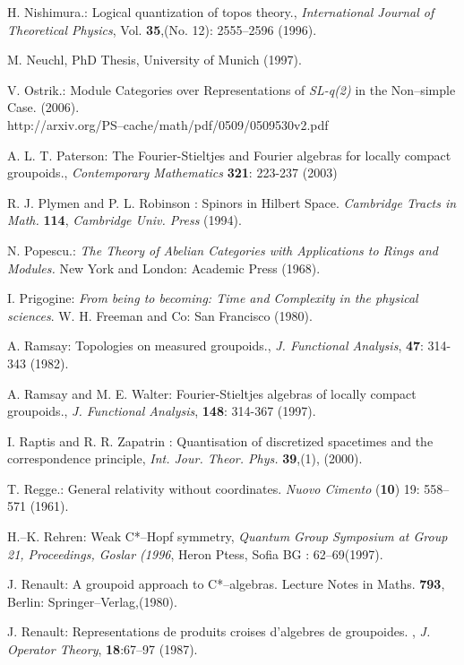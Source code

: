 \documentclass[12pt]{article}
\theoremstyle{plain}
\theoremstyle{definition}
\numberwithin{equation}{section}
\newcommand{\<}{{\langle}}
\begin{document}
\begin{thebibliography}{99}
H. Nishimura.: Logical quantization of topos theory., \textit{International Journal of Theoretical Physics}, Vol. \textbf{35},(No. 12): 2555--2596 (1996).

M. Neuchl, PhD Thesis, University of Munich (1997).

V. Ostrik.: Module Categories over Representations of \emph{SL-q(2)}
in the Non--simple Case. (2006). \\ http://arxiv.org/PS--cache/math/pdf/0509/0509530v2.pdf

A. L. T. Paterson: The Fourier-Stieltjes and Fourier algebras for locally
compact groupoids., \textit{Contemporary Mathematics} \textbf{321}: 223-237 (2003)

R. J. Plymen and P. L. Robinson :  Spinors in Hilbert Space.
\emph{Cambridge Tracts in Math.} \textbf{114}, \emph{Cambridge Univ. Press} (1994).

N. Popescu.: \emph{The Theory of Abelian Categories with Applications to Rings and
Modules.} New York and London: Academic Press (1968).

I. Prigogine:  \textit{From being to becoming: Time and Complexity in the physical sciences}. W. H. Freeman and Co: San Francisco (1980).

A. Ramsay: Topologies on measured groupoids., \textit{J. Functional Analysis}, \textbf{47}: 314-343 (1982).

A. Ramsay and M. E. Walter: Fourier-Stieltjes algebras of locally compact groupoids.,
\textit{J. Functional Analysis}, \textbf{148}: 314-367 (1997).

I. Raptis and R. R. Zapatrin : Quantisation of discretized spacetimes and the correspondence principle, \emph{Int. Jour.
Theor. Phys.} \textbf{39},(1), (2000).

T. Regge.: General relativity without coordinates. \textit{Nuovo Cimento} (\textbf{10}) 19: 558--571 (1961).

H.--K. Rehren: Weak C*--Hopf symmetry, \emph{Quantum Group
Symposium at Group 21, Proceedings, Goslar (1996}, Heron Ptess, Sofia BG : 62--69(1997).

J. Renault: A groupoid approach to C*--algebras. Lecture Notes in Maths. \textbf{793}, Berlin: Springer--Verlag,(1980).

J. Renault: Representations de produits croises d'algebres de groupoides. ,
\textit{J. Operator Theory}, \textbf{18}:67--97 (1987).



\end{thebibliography}
\end{document}
